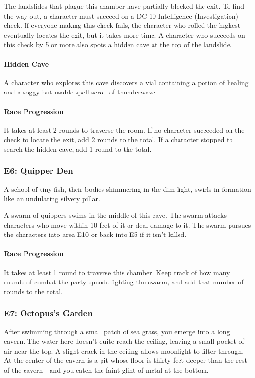 \documentclass[10pt,a4paper,twoside,bg=print,twocolumn,openany,nodeprecatedcode]{dndbook}
\begin{document}
The landslides that plague this chamber have partially blocked the exit. To find the way out, a character must succeed on a DC 10 Intelligence (Investigation) check. If everyone making this check fails, the character who rolled the highest eventually locates the exit, but it takes more time. A character who succeeds on this check by 5 or more also spots a hidden cave at the top of the landslide.

\paragraph{Hidden Cave}
A character who explores this cave discovers a vial containing a potion of healing and a soggy but usable spell scroll of thunderwave.

\paragraph{Race Progression}
It takes at least 2 rounds to traverse the room. If no character succeeded on the check to locate the exit, add 2 rounds to the total. If a character stopped to search the hidden cave, add 1 round to the total.


\subsubsection{E6: Quipper Den}
\begin{DndReadAloud}{}
A school of tiny fish, their bodies shimmering in the dim light, swirls in formation like an undulating silvery pillar.

\end{DndReadAloud}

A swarm of quippers swims in the middle of this cave. The swarm attacks characters who move within 10 feet of it or deal damage to it. The swarm pursues the characters into area E10 or back into E5 if it isn't killed.

\paragraph{Race Progression}
It takes at least 1 round to traverse this chamber. Keep track of how many rounds of combat the party spends fighting the swarm, and add that number of rounds to the total.

  
\subsubsection{E7: Octopus's Garden}
\begin{DndReadAloud}{}
After swimming through a small patch of sea grass, you emerge into a long cavern. The water here doesn't quite reach the ceiling, leaving a small pocket of air near the top. A slight crack in the ceiling allows moonlight to filter through. At the center of the cavern is a pit whose floor is thirty feet deeper than the rest of the cavern—and you catch the faint glint of metal at the bottom.

\end{DndReadAloud}
\end{document}
